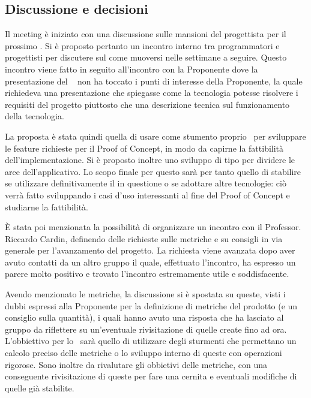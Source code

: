 \subsection{Discussione e decisioni}
\par Il meeting è iniziato con una discussione sulle mansioni del progettista per il prossimo . 
Si è proposto pertanto un incontro interno tra programmatori e progettisti per discutere sul come muoversi nelle settimane a seguire. 
Questo incontro viene fatto in seguito all'incontro con la Proponente dove la presentazione del \  non ha toccato i punti di interesse della Proponente, la quale richiedeva una presentazione che spiegasse come la tecnologia potesse risolvere i requisiti del progetto piuttosto che una descrizione tecnica sul funzionamento della tecnologia.
\par La proposta è stata quindi quella di usare come stumento proprio \ per sviluppare le feature richieste per il Proof of Concept, in modo da capirne la fattibilità dell'implementazione. 
Si è proposto inoltre uno sviluppo di tipo  per dividere le aree dell'applicativo. 
Lo scopo finale per questo  sarà per tanto quello di stabilire se utilizzare definitivamente il  in questione o se adottare altre tecnologie: ciò verrà fatto sviluppando i casi d'uso interessanti al fine del Proof of Concept e studiarne la fattibilità.
\par È stata poi menzionata la possibilità di organizzare un incontro con il Professor. Riccardo Cardin, definendo delle richieste sulle metriche e su consigli in via generale per l'avanzamento del progetto. 
La richiesta viene avanzata dopo aver avuto contatti da un altro gruppo il quale, effettuato l'incontro, ha espresso un parere molto positivo e trovato l'incontro estremamente utile e soddisfacente.
\par Avendo menzionato le metriche, la discussione si è spostata su queste, visti i dubbi espressi alla Proponente per la definizione di metriche del prodotto (e un consiglio sulla quantità), i quali hanno avuto una risposta che ha lasciato al gruppo da riflettere su un'eventuale rivisitazione di quelle create fino ad ora. 
L'obbiettivo per lo \ sarà quello di utilizzare degli sturmenti che permettano un calcolo preciso delle metriche o lo sviluppo interno di queste con operazioni rigorose. 
Sono inoltre da rivalutare gli obbietivi delle metriche, con una conseguente rivisitazione di queste per fare una cernita e eventuali modifiche di quelle già stabilite.
